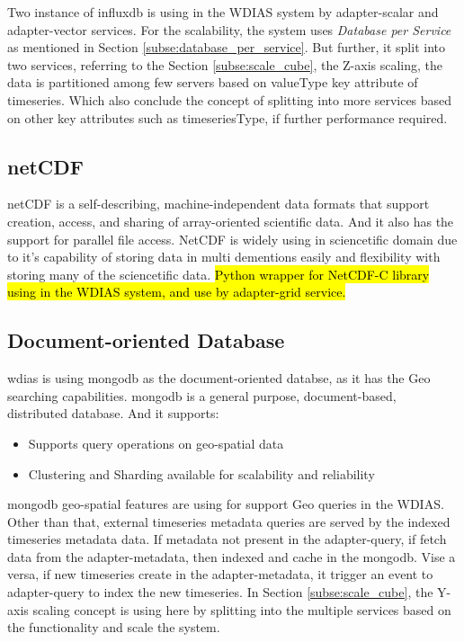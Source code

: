 Two instance of \acrshort{influxdb} is using in the WDIAS system by adapter-scalar and adapter-vector services. For the scalability, the system uses \emph{Database per Service} as mentioned in Section \ref{subse:database_per_service}.
But further, it split into two services, referring to the Section \ref{subse:scale_cube}, the Z-axis scaling, the data is partitioned among few servers based on valueType key attribute of timeseries.
Which also conclude the concept of splitting into more services based on other key attributes such as timeseriesType, if further performance required.

\subsection{\acrfull{netCDF}} 
\label{subse:netcdf}
\acrshort{netCDF} \cite{unidataUnidataNetCDF} is a self-describing, machine-independent data formats that support creation, access, and sharing of array-oriented scientific data.
And it also has the support for parallel file access.
NetCDF is widely using in sciencetific domain due to it's capability of storing data in multi dementions easily and flexibility with storing many of the sciencetific data. \hl{
Python wrapper for NetCDF-C library using in the WDIAS system, and use by adapter-grid service.}

\subsection{Document-oriented Database}
\label{subse:mongodb}

\acrshort{wdias} is using \acrshort{mongodb} as the document-oriented databse, as it has the Geo searching capabilities.
\acrshort{mongodb} \cite{mongodbMongoDBManual} is a general purpose, document-based, distributed database. And it supports:
\begin{itemize}
  \item Supports query operations on geo-spatial data \cite{mongodbMongoDBManual}
  \item Clustering and Sharding available for scalability and reliability
\end{itemize}
\acrshort{mongodb} geo-spatial features are using for support Geo queries in the WDIAS. Other than that, external timeseries metadata queries are served by the indexed timeseries metadata data.
If metadata not present in the adapter-query, if fetch data from the adapter-metadata, then indexed and cache in the \acrshort{mongodb}. Vise a versa, if new timeseries create in the adapter-metadata, it trigger an event to adapter-query to index the new timeseries.
In Section \ref{subse:scale_cube}, the Y-axis scaling concept is using here by splitting into the multiple services based on the functionality and scale the system.

